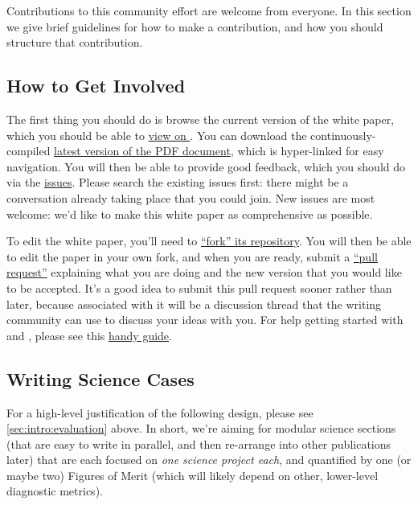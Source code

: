 
Contributions to this community effort are welcome from everyone. In
this section we give brief guidelines for how to make a contribution,
and how you should structure that contribution.

\subsection{How to Get Involved}

The first thing you should do is browse the current version of the white
paper, which you should be able to \href{http://ls.st/iw2}{view on
\GitHub}. You can download the  continuously-compiled
\href{http://www.slac.stanford.edu/~digel/ObservingStrategy/whitepaper/LSST_Observing_Strategy_White_Paper.pdf}{latest
version of the PDF document}, which is hyper-linked for easy navigation.
You will then be able to provide good feedback, which you should do via
the
\href{https://github.com/LSSTScienceCollaborations/ObservingStrategy/issues}{\GitHub
issues}. Please search the existing issues first: there might be a
conversation already taking place that you could join. New issues are
most welcome: we'd like to make this white paper as comprehensive as
possible.

To edit the white paper, you'll need to
\href{https://help.github.com/articles/fork-a-repo/}{``fork'' its
repository}. You will then  be able to edit the paper in your own
fork, and when you are ready,  submit a
\href{https://help.github.com/articles/using-pull-requests/}{``pull
request''} explaining what you are doing and the new version that  you
would like to be accepted. It's a good idea to submit this pull
request sooner rather than later, because associated with it will be a
discussion thread that the writing community can use to discuss your
ideas with you. For help getting started with \git and \GitHub, please
see this
\href{https://github.com/drphilmarshall/GettingStarted#top}{handy
guide}.


\subsection{Writing Science Cases}

For a high-level justification of the following design, please see
\autoref{sec:intro:evaluation} above. In short, we're aiming for modular
science sections (that are easy to write in parallel, and then
re-arrange into other publications later) that are each focused on {\it
one science project each}, and quantified by one (or maybe two) Figures
of Merit (which will likely depend on other, lower-level diagnostic
metrics).

